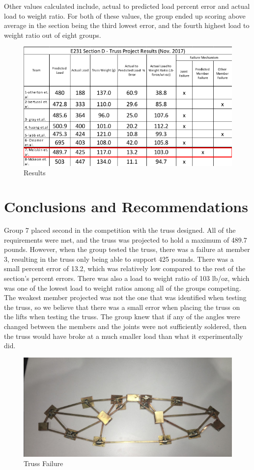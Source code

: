 \documentclass{article}
\begin{document}
Other values calculated include, actual to predicted load percent error and actual load to weight ratio. For both of these values, the group ended up scoring above average in the section being the third lowest error, and the fourth highest load to weight ratio out of eight groups. 

\begin{figure}[ht]
\caption{Results}
\centering
\includegraphics[width=400pt]{TrussResults.png}
\end{figure}



\newpage

\section{Conclusions and Recommendations}
Group 7 placed second in the competition with the truss designed. All of the requirements were met, and the truss was projected to hold a maximum of 489.7 pounds. However, when the group tested the truss, there was a failure at member 3, resulting in the truss only being able to support 425 pounds. There was a small percent error of 13.2, which was relatively low compared to the rest of the section’s percent errors. There was also a load to weight ratio of 103 lb/oz, which was one of the lowest load to weight ratios among all of the groups competing. The weakest member projected was not the one that was identified when testing the truss, so we believe that there was a small error when placing the truss on the lifts when testing the truss. The group knew that if any of the angles were changed between the members and the joints were not sufficiently soldered, then the truss would have broke at a much smaller load than what it experimentally did. 

\begin{figure}[ht]
\caption{Truss Failure}
\centering
\includegraphics[width=350pt]{BuckledTruss.png}
\end{figure}
\end{document}
